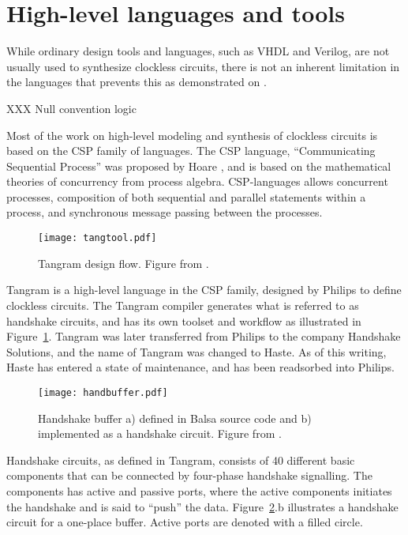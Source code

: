 \section{High-level languages and tools}
\label{sec:tools}

While ordinary design tools and languages, such as VHDL and Verilog, are not
usually used to synthesize clockless circuits, there is not an
inherent limitation in the languages that prevents this as
demonstrated on \cite[pp. 135-137]{sparso}.

XXX Null convention logic

Most of the work on high-level modeling and synthesis of clockless
circuits is based on the CSP family of languages. The CSP language,
``Communicating Sequential Process'' was proposed by Hoare \cite{csp},
and is based on the mathematical theories of concurrency from process
algebra. CSP-languages allows concurrent processes, composition of
both sequential and parallel statements within a process, and
synchronous message passing between the processes.

\begin{figure}[htbp]
  \centering
  \texttt{[image: tangtool.pdf]}
  \caption{Tangram design flow. Figure from \cite{fullscan}.}
  \label{fig:tangtool}
\end{figure}

Tangram is a high-level language in the CSP family, designed by
Philips to define clockless circuits. The Tangram compiler generates
what is referred to as handshake circuits, and has its own toolset and
workflow as illustrated in Figure~\ref{fig:tangtool}. Tangram was
later transferred from Philips to the company Handshake Solutions, and
the name of Tangram was changed to Haste. As of this writing, Haste
has entered a state of maintenance, and has been readsorbed into
Philips.

\begin{figure}[htbp]
  \centering
  \texttt{[image: handbuffer.pdf]}
  \caption{Handshake buffer a) defined in Balsa source code and b)
    implemented as a handshake circuit. Figure from
    \cite{taylor2008automatic}.}
  \label{fig:handbuffer}
\end{figure}

Handshake circuits, as defined in Tangram, consists of 40 different
basic components that can be connected by four-phase handshake
signalling. The components has active and passive ports, where the
active components initiates the handshake and is said to ``push'' the
data. Figure~\ref{fig:handbuffer}.b illustrates a handshake circuit for
a one-place buffer. Active ports are denoted with a filled circle.


